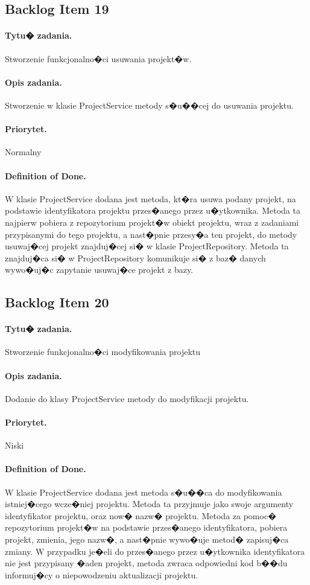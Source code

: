 ﻿\documentclass[a4paper]{article}
\begin{document}
\subsection{Backlog Item 19} 
\paragraph{Tytu� zadania.}  Stworzenie funkcjonalno�ci usuwania projekt�w.
\paragraph{Opis zadania.} Stworzenie w klasie ProjectService metody s�u��cej do usuwania projektu. 
\paragraph{Priorytet.} Normalny
\paragraph{Definition of Done.} W klasie ProjectService dodana jest metoda, kt�ra usuwa podany projekt, na podstawie identyfikatora projektu przes�anego 
przez u�ytkownika. Metoda ta najpierw pobiera z repozytorium projekt�w obiekt projektu, wraz z zadaniami przypisanymi do tego projektu, a nast�pnie przesy�a ten projekt, do metody usuwaj�cej projekt znajduj�cej si� w klasie ProjectRepository. Metoda ta znajduj�ca si� w ProjectRepository komunikuje si� z baz� danych wywo�uj�c zapytanie usuwaj�ce projekt z bazy. 

\subsection{Backlog Item 20} 
\paragraph{Tytu� zadania.} Stworzenie funkcjonalno�ci modyfikowania projektu
\paragraph{Opis zadania.} Dodanie do klasy ProjectService metody do modyfikacji projektu.
\paragraph{Priorytet.} Niski
\paragraph{Definition of Done.} W klasie ProjectService dodana jest metoda s�u��ca do modyfikowania istniej�cego wcze�niej projektu. Metoda ta przyjmuje jako swoje argumenty identyfikator projektu, oraz now� nazw� projektu. Metoda za pomoc� repozytorium projekt�w na podstawie przes�anego identyfikatora, pobiera projekt, zmienia, jego nazw�, a nast�pnie wywo�uje metod� zapisuj�ca zmiany. W przypadku je�eli do przes�anego przez u�ytkownika identyfikatora nie jest przypisany �aden projekt, metoda zwraca odpowiedni kod b��du informuj�cy o niepowodzeniu aktualizacji projektu.
\end{document}
